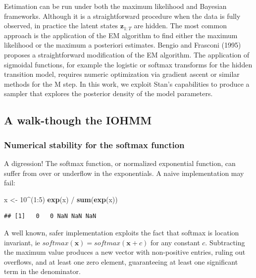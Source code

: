\documentclass[]{article}
\newenvironment{Shaded}{\begin{snugshade}}{\end{snugshade}}
\newcommand{\KeywordTok}[1]{\textcolor[rgb]{0.13,0.29,0.53}{\textbf{{#1}}}}
\newcommand{\DecValTok}[1]{\textcolor[rgb]{0.00,0.00,0.81}{{#1}}}
\newcommand{\StringTok}[1]{\textcolor[rgb]{0.31,0.60,0.02}{{#1}}}
\newcommand{\NormalTok}[1]{{#1}}
\newcommand{\mat}[1]{\mathbf{#1}}
\begin{document}
Estimation can be run under both the maximum likelihood and Bayesian
frameworks. Although it is a straightforward procedure when the data is
fully observed, in practice the latent states \(\mat{z}_{1:T}\) are
hidden. The most common approach is the application of the EM algorithm
to find either the maximum likelihood or the maximum a posteriori
estimates. Bengio and Frasconi (1995) proposes a straightforward
modification of the EM algorithm. The application of sigmoidal
functions, for example the logistic or softmax transforms for the hidden
transition model, requires numeric optimization via gradient ascent or
similar methods for the M step. In this work, we exploit Stan's
capabilities to produce a sampler that explores the posterior density of
the model parameters.

\subsection{A walk-though the IOHMM}\label{a-walk-though-the-iohmm}

\subsubsection{Numerical stability for the softmax
function}\label{numerical-stability-for-the-softmax-function}

A digression! The softmax function, or normalized exponential function,
can suffer from over or underflow in the exponentials. A naive
implementation may fail:

\begin{Shaded}
\begin{Highlighting}[]
\NormalTok{x <-}\StringTok{ }\DecValTok{10}\NormalTok{^(}\DecValTok{1}\NormalTok{:}\DecValTok{5}\NormalTok{)}
\KeywordTok{exp}\NormalTok{(x) /}\StringTok{ }\KeywordTok{sum}\NormalTok{(}\KeywordTok{exp}\NormalTok{(x))}
\end{Highlighting}
\end{Shaded}

\begin{verbatim}
## [1]   0   0 NaN NaN NaN
\end{verbatim}

A well known, safer implementation exploits the fact that softmax is
location invariant, ie \(softmax(\mat{x}) = softmax(\mat{x} + c)\) for
any constant \(c\). Subtracting the maximum value produces a new vector
with non-positive entries, ruling out overflows, and at least one zero
element, guaranteeing at least one significant term in the denominator.
\end{document}
